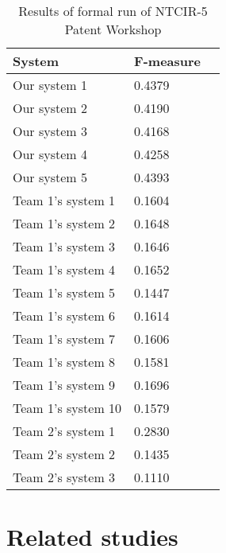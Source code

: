 \documentclass[english]{jnlp_1.2c}
\begin{document}
\begin{table}[t]
\caption{Results of formal run of NTCIR-5 Patent Workshop}
\label{tab:NTCIR5}
\begin{center}
\begin{tabular}{|l|l|l|} \hline
System &  F-measure\\\hline
Our system 1            & 0.4379\\
Our system 2            & 0.4190\\
Our system 3            & 0.4168\\
Our system 4            & 0.4258\\
Our system 5            & 0.4393\\\hline
Team 1's system 1 & 0.1604\\
Team 1's system 2 & 0.1648\\
Team 1's system 3 & 0.1646\\
Team 1's system 4 & 0.1652\\
Team 1's system 5 & 0.1447\\
Team 1's system 6 & 0.1614\\
Team 1's system 7 & 0.1606\\
Team 1's system 8 & 0.1581\\
Team 1's system 9 & 0.1696\\
Team 1's system 10 & 0.1579\\\hline
Team 2's system 1 & 0.2830\\
Team 2's system 2 & 0.1435\\
Team 2's system 3 & 0.1110\\\hline
\end{tabular}
\end{center}
\end{table}

\section{Related studies}
\label{sec:related}
\end{document}
